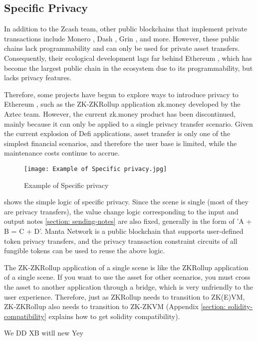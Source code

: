 \subsection{Specific Privacy}

In addition to the Zcash \cite{website:Zcash} team, other public blockchains that implement private transactions include Monero \cite{website:Monero}, Dash \cite{website:Dash}, Grin \cite{website:Grin}, and more. However, these public chains lack programmability and can only be used for private asset transfers. Consequently, their ecological development lags far behind Ethereum \cite{website:Ethereum}, which has become the largest public chain in the ecosystem due to its programmability, but lacks privacy features.

Therefore, some projects have begun to explore ways to introduce privacy to Ethereum \cite{website:Ethereum}, such as the ZK-ZKRollup application zk.money \cite{website:zk.money} developed by the Aztec \cite{website:Aztec} team. However, the current zk.money \cite{website:zk.money} product has been discontinued, mainly because it can only be applied to a single privacy transfer scenario. Given the current explosion of Defi applications, asset transfer is only one of the simplest financial scenarios, and therefore the user base is limited, while the maintenance costs continue to accrue.
\begin{figure}[!ht]
    \centering
    \texttt{[image: Example of Specific privacy.jpg]}
    \caption{Example of Specific privacy}
    \label{fig:Example of Specific privacy}
\end{figure}

 shows the simple logic of specific privacy. Since the scene is single (most of 
they are privacy transfers), the value change logic corresponding to the input and output 
notes \ref{section: sending-notes} are also fixed, generally in the form of 'A + B = C + D'. Manta Network\cite{website:Manta-network} is a 
public blockchain that supports user-defined token privacy transfers, and the privacy transaction 
constraint circuits of all fungible tokens can be used to reuse the above logic.

The ZK-ZKRollup application of a single scene is like the ZKRollup application of a 
single scene. If you want to use the asset for 
other scenarios, you must cross the asset to another application through a bridge, 
which is very unfriendly to the user experience. Therefore, just as ZKRollup needs to 
transition to ZK(E)VM, ZK-ZKRollup also needs to transition to ZK-ZKVM (Appendix \ref{section: solidity-compatibility} explains 
how to get solidity compatibility).


We DD XB witll new Yey 
